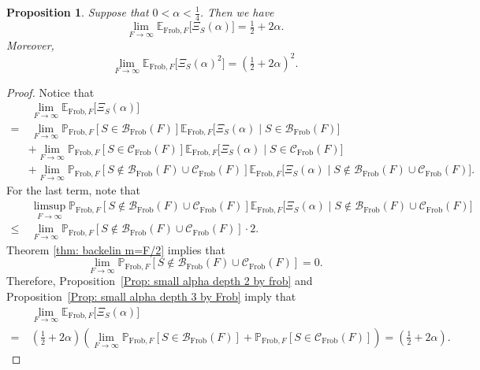 \documentclass[12pt]{amsart}
\def\B{{\mathcal B}}
\def\E{{\mathbb E}}
\renewcommand{\P}{\mathbb{P}}
\newcommand{\cC}{\mathcal{C}}
\newcommand{\Frob}{\text{Frob}}
\newtheorem{proposition}[theorem]{Proposition}
\begin{document}
\begin{proposition}\label{Prop: small alpha by Frob}
Suppose that $0<\alpha<\frac{1}{4}$.
Then we have
\[\lim_{F\to\infty} \E_{\Frob,F} \big[\Xi_S(\alpha)\big] = \tfrac{1}{2}+2\alpha. \]
Moreover,
\[\lim_{F\to\infty} \E_{\Frob,F} \big[\Xi_S(\alpha)^2\big] = (\tfrac{1}{2}+2\alpha)^2. \]
\end{proposition}
\begin{proof}
Notice that
\begin{align*}
&\ \lim_{F\to\infty} \E_{\Frob,F} \big[\Xi_S(\alpha)\big]\\ 
= &\ \lim_{F\to\infty} \P_{\Frob,F}[S\in \B_{\Frob}(F)] \E_{\Frob,F} \big[\Xi_S(\alpha) \mid S\in \B_{\Frob}(F)\big]\\
& +\lim_{F\to\infty}\P_{\Frob,F}[S\in \cC_{\Frob}(F)] \E_{\Frob,F} \big[\Xi_S(\alpha) \mid S\in \cC_{\Frob}(F)\big]\\
& +\lim_{F\to\infty}\P_{\Frob,F}[S\notin \B_{\Frob}(F)\cup\cC_{\Frob}(F)] \E_{\Frob,F} \big[\Xi_S(\alpha) \mid S\notin \B_{\Frob}(F)\cup\cC_{\Frob}(F)\big].
\end{align*}
For the last term, note that
\begin{align*}
&\ \limsup_{F\to\infty}\P_{\Frob,F}[S\notin \B_{\Frob}(F)\cup\cC_{\Frob}(F)] \E_{\Frob,F} \big[\Xi_S(\alpha) \mid S\notin \B_{\Frob}(F)\cup\cC_{\Frob}(F)\big]\\
\leq &\ \lim_{F\to\infty}\P_{\Frob,F}[S\notin \B_{\Frob}(F)\cup\cC_{\Frob}(F)] \cdot 2.
\end{align*}
Theorem \ref{thm: backelin m=F/2} implies that 
\[
\lim_{F\to\infty}\P_{\Frob,F}[S\notin \B_{\Frob}(F)\cup\cC_{\Frob}(F)] = 0.
\]
Therefore, Proposition~\ref{Prop: small alpha depth 2 by frob} and Proposition~\ref{Prop: small alpha depth 3 by Frob} imply that 
\begin{align*}
&\ \lim_{F\to\infty} \E_{\Frob,F} \big[\Xi_S(\alpha)\big]\\
= &\  (\tfrac{1}{2}+2\alpha ) \left(\lim_{F\to\infty} \P_{\Frob,F}[S\in \B_{\Frob}(F)] 
+\P_{\Frob,F}[S\in \cC_{\Frob}(F)] \right)
=(\tfrac{1}{2}+2\alpha ).
\end{align*}


\end{proof}
\end{document}
